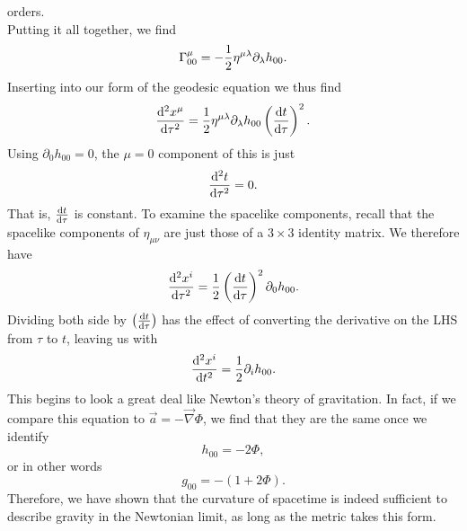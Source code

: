 orders.\\
Putting it all together, we find
\begin{equation} 
\Gamma^\mu_{00} = -\frac{1}{2} \eta^{\mu \lambda} \partial_{\lambda} h_{00}.
\end{equation}
Inserting into our form of the geodesic equation we thus find
\begin{equation}
	\frac{\mathrm{d}^2 x^\mu}{\mathrm{d} \tau^2} = \frac{1}{2} \eta^{\mu \lambda} \partial_{\lambda} h_{00} \left(\frac{\mathrm{d} t}{\mathrm{d} \tau}\right)^2.
\end{equation}
Using $∂_0 h_{00} = 0$, the $μ = 0$ component of this is just
\begin{equation}
	\frac{\mathrm{d}^2 t}{\mathrm{d} \tau^2} = 0.
\end{equation}
That is, $\frac{\mathrm{d} t}{\mathrm{d} \tau}$
is constant. To examine the spacelike components, recall that the
spacelike components of $η_{μν}$ are just those of a $3 × 3$ identity matrix. We therefore have
\begin{equation}
	\frac{\mathrm{d}^2 x^i}{\mathrm{d} \tau^2} = \frac{1}{2} \left(\frac{\mathrm{d} t}{\mathrm{d} \tau}\right)^2 \partial_0 h_{00}.
\end{equation}
Dividing both side by $\left(\frac{\mathrm{d} t}{\mathrm{d} \tau}\right)$ has the effect of converting the derivative on the LHS from $\tau$ to $t$, leaving us with
\begin{equation}
	\frac{\mathrm{d}^2 x^i}{\mathrm{d} t^2} = \frac{1}{2} \partial_i h_{00}.
\end{equation}
This begins to look a great deal like Newton’s theory of gravitation. In fact, if we compare
this equation to $\vec{a}=-\vec{\nabla} \Phi$, we find that they are the same once we identify
\begin{equation}
	h_{00} = -2 \Phi,
\end{equation}
or in other words
\begin{equation}
	g_{00} = -(1+2 \Phi).
\end{equation}
Therefore, we have shown that the curvature of spacetime is indeed sufficient to describe
gravity in the Newtonian limit, as long as the metric takes this form.

